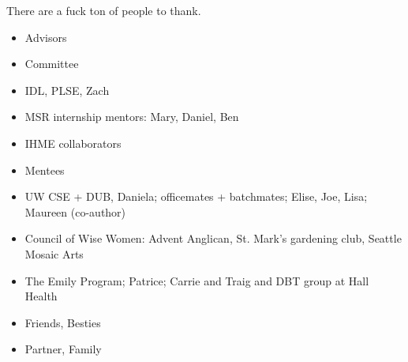 There are a fuck ton of people to thank. 
\begin{itemize}
    \item Advisors 
    \item Committee
    \item IDL, PLSE, Zach
    \item MSR internship mentors: Mary, Daniel, Ben 
    \item IHME collaborators
    \item Mentees
    \item UW CSE + DUB, Daniela; officemates + batchmates; Elise, Joe, Lisa; Maureen (co-author)
    \item Council of Wise Women: Advent Anglican, St. Mark's gardening club, Seattle Mosaic Arts
    \item The Emily Program; Patrice; Carrie and Traig and DBT group at Hall Health
    \item Friends, Besties
    \item Partner, Family
\end{itemize}
















